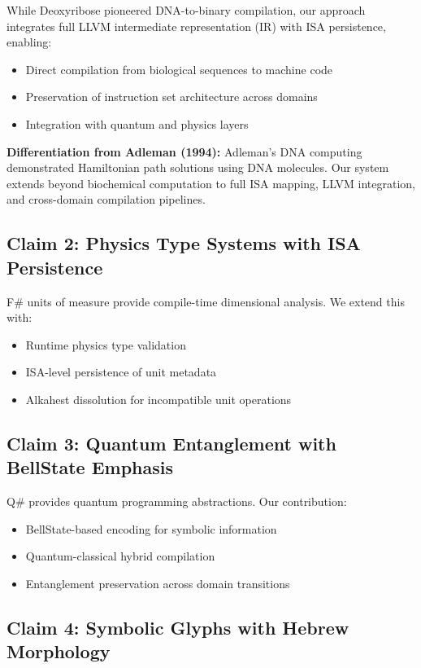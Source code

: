 \documentclass[11pt,a4paper]{article}
\begin{document}
While Deoxyribose \cite{deoxyribose} pioneered DNA-to-binary compilation, our approach integrates full LLVM intermediate representation (IR) with ISA persistence, enabling:
\begin{itemize}
    \item Direct compilation from biological sequences to machine code
    \item Preservation of instruction set architecture across domains
    \item Integration with quantum and physics layers
\end{itemize}

\textbf{Differentiation from Adleman (1994):} Adleman's DNA computing \cite{adleman} demonstrated Hamiltonian path solutions using DNA molecules. Our system extends beyond biochemical computation to full ISA mapping, LLVM integration, and cross-domain compilation pipelines.

\subsection{Claim 2: Physics Type Systems with ISA Persistence}

F\# units of measure \cite{fsharp} provide compile-time dimensional analysis. We extend this with:
\begin{itemize}
    \item Runtime physics type validation
    \item ISA-level persistence of unit metadata
    \item Alkahest dissolution for incompatible unit operations
\end{itemize}

\subsection{Claim 3: Quantum Entanglement with BellState Emphasis}

Q\# \cite{qsharp} provides quantum programming abstractions. Our contribution:
\begin{itemize}
    \item BellState-based encoding for symbolic information
    \item Quantum-classical hybrid compilation
    \item Entanglement preservation across domain transitions
\end{itemize}

\subsection{Claim 4: Symbolic Glyphs with Hebrew Morphology}
\end{document}
